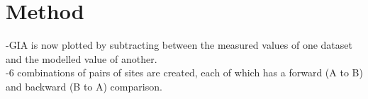 \documentclass{article}
\begin{document}
\section[2]{Method}
-GIA is now plotted by subtracting between the measured values of one dataset and the modelled value of another.\\
-6 combinations of pairs of sites are created, each of which has a forward (A to B) and backward (B to A) comparison.\\
\newpage
%

\newpage

\end{document}
